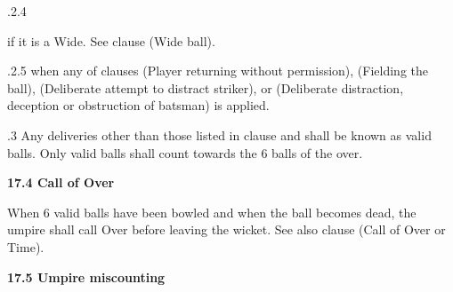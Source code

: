\documentclass[12pt]{article}
\begin{document}
\vspace{\baselineskip}
\begin{adjustwidth}{0.49in}{0.0in}
{\fontsize{9pt}{10.8pt}.2.4 \tabto{1.17in} {\fontsize{8pt}{9.6pt}\selectfont if it is a Wide. See clause (Wide ball).\par}\par}\par

\end{adjustwidth}


\vspace{\baselineskip}
\begin{adjustwidth}{1.18in}{0.01in}
{\fontsize{9pt}{10.8pt}.2.5 \tabto{1.17in} when any of clauses (Player returning without permission), (Fielding the ball),  (Deliberate attempt to distract striker), or (Deliberate distraction, deception or obstruction of batsman) is applied.\par}\par

\end{adjustwidth}


\vspace{\baselineskip}
\begin{adjustwidth}{0.5in}{0.19in}
{\fontsize{9pt}{10.8pt}.3 \tabto{0.49in} Any deliveries other than those listed in clause and shall be known as valid balls. Only valid balls shall count towards the 6 balls of the over.\par}\par

\end{adjustwidth}


\vspace{\baselineskip}
{\fontsize{11pt}{13.2pt}\selectfont \textbf{17.4 \tabto{0.47in} Call of Over}\par}\par


\vspace{\baselineskip}
\begin{adjustwidth}{0.0in}{0.06in}
{\fontsize{9pt}{10.8pt}\selectfont When 6 valid balls have been bowled and when the ball becomes dead, the umpire shall call Over before leaving the wicket. See also clause (Call of Over or Time).\par}\par

\end{adjustwidth}


\vspace{\baselineskip}
{\fontsize{11pt}{13.2pt}\selectfont \textbf{17.5 \tabto{0.47in} Umpire miscounting}\par}\par
\end{document}
